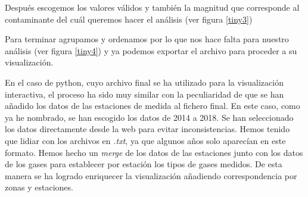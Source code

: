 
Después escogemos los valores válidos y también la magnitud que corresponde al contaminante del cuál queremos hacer el análisis (ver figura \ref{tiny3})


Para terminar agrupamos y ordenamos por lo que nos hace falta para nuestro análisis (ver figura \ref{tiny4}) y ya podemos exportar el archivo para proceder a su visualización.


 En el caso de python, cuyo archivo final se ha utilizado para la visualización interactiva, el proceso ha sido muy similar con la peculiaridad de que se han añadido los datos de las estaciones de medida al fichero final. En este caso, como ya he nombrado, se han escogido los datos de 2014 a 2018. Se han seleccionado los datos directamente desde la web para evitar inconsistencias. Hemos tenido que lidiar con los archivos en \textit{.txt}, ya que algunos años solo aparecían en este formato. Hemos hecho un \textit{merge} de los datos de las estaciones junto con los datos de los gases para establecer por estación los tipos de gases medidos. De esta manera se ha logrado enriquecer la visualización añadiendo correspondencia por zonas y estaciones.
 
